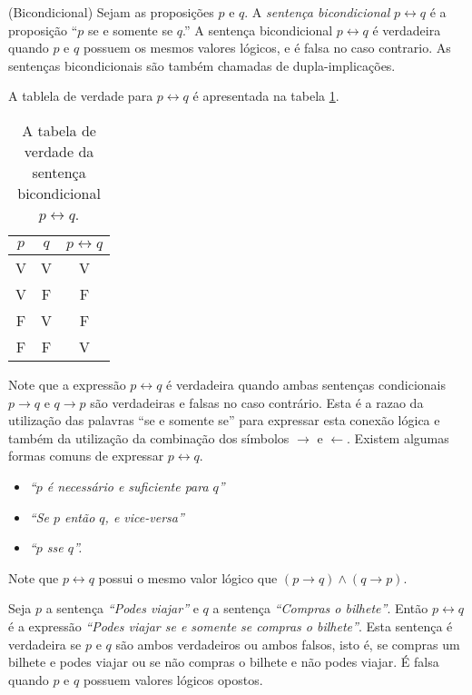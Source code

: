 \begin{defn}
\label{def16}
(Bicondicional) Sejam as proposições $p$ e $q$. A \emph{sentença bicondicional}
$p \leftrightarrow q$ é a proposição ``$p$ se e somente se $q$.'' A sentença
bicondicional $p \leftrightarrow q$ é verdadeira quando $p$ e $q$ possuem os
mesmos valores lógicos, e é falsa no caso contrario. As sentenças
bicondicionais são também chamadas de dupla-implicações.
\end{defn}

A tablela de verdade para $p \leftrightarrow q$ é apresentada na tabela
\ref{tab16}. 

\begin{table}[H]
\centering
\begin{tabular}{|c|c|c|}%
\toprule
\textbf{$p$} & \textbf{$q$} & \textbf{$p \leftrightarrow q$}\\ 
\midrule
V &	V & V\\
V &	F & F\\
F &	V & F\\
F &	F & V\\
\bottomrule%
\end{tabular}%
\caption{A tabela de verdade da sentença bicondicional $p \leftrightarrow q$.}
\label{tab16}
\end{table}

Note que a expressão $p \leftrightarrow q$ é verdadeira quando ambas sentenças
condicionais $p \to q$ e $q \to p$ são verdadeiras e falsas no caso contrário.
Esta é a razao da utilização das palavras ``se e somente se'' para expressar
esta conexão lógica e também da utilização da combinação dos símbolos $\rightarrow$ e $\leftarrow$. Existem algumas formas comuns de
expressar $p \leftrightarrow q$.
\begin{itemize}
  \item \emph{``$p$ é necessário e suficiente para $q$''}
  \item \emph{``Se $p$ então $q$, e vice-versa''}
  \item \emph{``$p$ sse $q$''.}
\end{itemize}

Note que $p \leftrightarrow q$ possui o mesmo valor lógico que $(p \to q) \land
(q \to p)$.

\label{exem18}
\begin{exmp}
Seja $p$ a sentença \emph{``Podes viajar''} e $q$ a sentença \emph{``Compras o
bilhete''}.
Então $p \leftrightarrow q$ é a expressão \emph{``Podes viajar se e somente se
compras o bilhete''}. Esta sentença é verdadeira se $p$ e $q$ são ambos
verdadeiros ou ambos falsos, isto é, se compras um bilhete e podes viajar ou se
não compras o bilhete e não podes viajar. É falsa quando $p$ e $q$ possuem valores lógicos
opostos.
\end{exmp}

